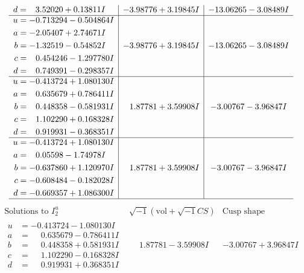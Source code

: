 \documentclass[1p]{elsarticle_modified}
\theoremstyle{definition}
\newcommand{\I}{\sqrt{-1}}
\begin{document}
$$\begin{array}{c|c|c}
\begin{aligned}
d &= \phantom{-}3.52020 + 0.13811 I\end{aligned}
 & -3.98776 + 3.19845 I & -13.06265 - 3.08489 I \\ \hline\begin{aligned}
u &= -0.713294 - 0.504864 I \\
a &= -2.05407 + 2.74671 I \\
b &= -1.32519 - 0.54852 I \\
c &= \phantom{-}0.454246 - 1.297780 I \\
d &= \phantom{-}0.749391 - 0.298357 I\end{aligned}
 & -3.98776 + 3.19845 I & -13.06265 - 3.08489 I \\ \hline\begin{aligned}
u &= -0.413724 + 1.080130 I \\
a &= \phantom{-}0.635679 + 0.786411 I \\
b &= \phantom{-}0.448358 - 0.581931 I \\
c &= \phantom{-}1.102290 + 0.168328 I \\
d &= \phantom{-}0.919931 - 0.368351 I\end{aligned}
 & \phantom{-}1.87781 + 3.59908 I & -3.00767 - 3.96847 I \\ \hline\begin{aligned}
u &= -0.413724 + 1.080130 I \\
a &= \phantom{-}0.05598 - 1.74978 I \\
b &= -0.637860 + 1.120970 I \\
c &= -0.608484 - 0.182028 I \\
d &= -0.669357 + 1.086300 I\end{aligned}
 & \phantom{-}1.87781 + 3.59908 I & -3.00767 - 3.96847 I\\
 \hline 
 \end{array}$$\newpage$$\begin{array}{c|c|c}  
\text{Solutions to }I^u_{2}& \I (\text{vol} + \sqrt{-1}CS) & \text{Cusp shape}\\
 \hline 
\begin{aligned}
u &= -0.413724 - 1.080130 I \\
a &= \phantom{-}0.635679 - 0.786411 I \\
b &= \phantom{-}0.448358 + 0.581931 I \\
c &= \phantom{-}1.102290 - 0.168328 I \\
d &= \phantom{-}0.919931 + 0.368351 I\end{aligned}
 & \phantom{-}1.87781 - 3.59908 I & -3.00767 + 3.96847 I \\ \hline\begin{aligned}

\end{aligned}
\end{array}$$
\end{document}
